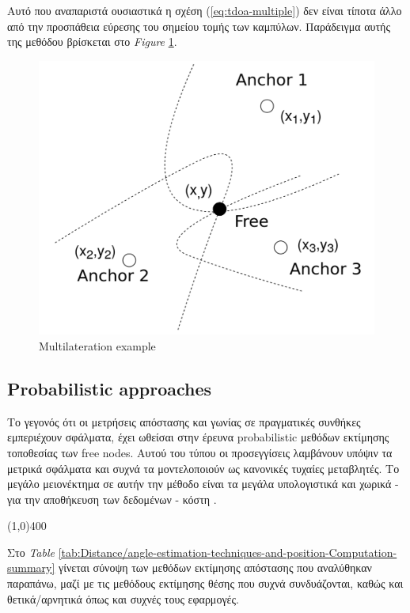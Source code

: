 Αυτό που αναπαριστά ουσιαστικά η σχέση (\ref{eq:tdoa-multiple}) δεν είναι τίποτα άλλο από την προσπάθεια εύρεσης του σημείου τομής των καμπύλων.
Παράδειγμα αυτής της μεθόδου βρίσκεται στο \emph{Figure} \ref{fig:Multilateration}.

\begin{figure} [H]
	\centering
	\includegraphics[width=0.5\linewidth]{../Photos/multilateration.png}
	\decoRule
	\caption[Multilateration example]{Multilateration example}
	\label{fig:Multilateration}
\end{figure}


\subsection{Probabilistic approaches}
Το γεγονός ότι οι μετρήσεις απόστασης και γωνίας σε πραγματικές συνθήκες εμπε\-ριέ\-χουν σφάλματα, έχει ωθείσαι στην έρευνα 
probabilistic μεθόδων εκτίμησης τοποθεσίας των free nodes. Αυτού του τύπου οι προσεγγίσεις λαμβάνουν υπόψιν τα μετρικά σφάλματα και συχνά τα μοντελοποιούν ως κανονικές
τυχαίες μεταβλητές. Το μεγάλο μειονέκτημα σε αυτήν την μέθοδο είναι τα μεγάλα υπολογιστικά και χωρικά - για την αποθήκευση των δεδομένων - κόστη \cite{wsn-Localization-systems}. 

\vspace{0.9\baselineskip}
\begin{center}
	\line(1,0){400}
\end{center}
\vspace{0.9\baselineskip}

Στο \emph{Table} \ref{tab:Distance/angle-estimation-techniques-and-position-Computation-summary} γίνεται σύνοψη των μεθόδων εκτίμησης απόστασης
που αναλύθηκαν παραπάνω, μαζί με τις μεθόδους εκτίμησης θέσης που συχνά συνδυάζονται, καθώς και θετικά/αρνητικά όπως και συχνές τους εφαρμογές. 
 
